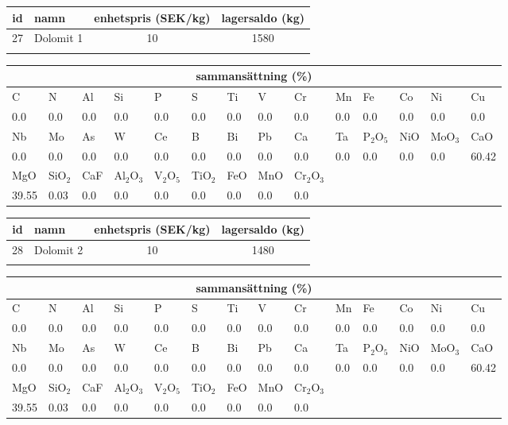 \begin{center}
{\scriptsize\addtolength{\tabcolsep}{-3pt}
\begin{tabular}{clcc}
id&namn&enhetspris (SEK/kg)&lagersaldo (kg)\\
\hline
27&Dolomit 1&10&1580\\\\
\end{tabular}
\begin{tabular}{llllllllllllll}
\multicolumn{14}{c}{sammansättning (\%)}\\
\hline
C&N&Al&Si&P&S&Ti&V&Cr&Mn&Fe&Co&Ni&Cu\\
\hline
0.0&0.0&0.0&0.0& 0.0&0.0&0.0&0.0& 0.0&0.0&0.0&0.0& 0.0&0.0\\
\hline
Nb&Mo&As&W&Ce&B&Bi&Pb&Ca&Ta&P$_2$O$_5$&NiO&MoO$_3$&CaO\\
\hline
0.0& 0.0& 0.0& 0.0& 0.0& 0.0& 0.0& 0.0& 0.0& 0.0& 0.0& 0.0& 0.0& 60.42\\
\hline
MgO&SiO$_2$&CaF&Al$_2$O$_3$&V$_2$O$_5$&TiO$_2$&FeO&MnO&Cr$_2$O$_3$\\
\hline
39.55& 0.03& 0.0& 0.0& 0.0& 0.0& 0.0& 0.0& 0.0\\
\end{tabular}
}
\end{center}

\begin{center}
{\scriptsize\addtolength{\tabcolsep}{-3pt}
\begin{tabular}{clcc}
id&namn&enhetspris (SEK/kg)&lagersaldo (kg)\\
\hline
28&Dolomit 2&10&1480\\\\
\end{tabular}
\begin{tabular}{llllllllllllll}
\multicolumn{14}{c}{sammansättning (\%)}\\
\hline
C&N&Al&Si&P&S&Ti&V&Cr&Mn&Fe&Co&Ni&Cu\\
\hline
0.0&0.0&0.0&0.0& 0.0&0.0&0.0&0.0& 0.0&0.0&0.0&0.0& 0.0&0.0\\
\hline
Nb&Mo&As&W&Ce&B&Bi&Pb&Ca&Ta&P$_2$O$_5$&NiO&MoO$_3$&CaO\\
\hline
0.0& 0.0& 0.0& 0.0& 0.0& 0.0& 0.0& 0.0& 0.0& 0.0& 0.0& 0.0& 0.0& 60.42\\
\hline
MgO&SiO$_2$&CaF&Al$_2$O$_3$&V$_2$O$_5$&TiO$_2$&FeO&MnO&Cr$_2$O$_3$\\
\hline
39.55& 0.03& 0.0& 0.0& 0.0& 0.0& 0.0& 0.0& 0.0\\
\end{tabular}
}
\end{center}

